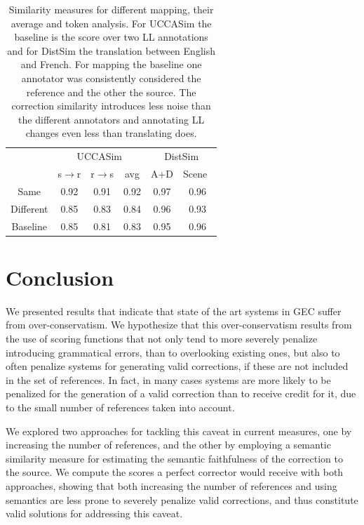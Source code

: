 \documentclass[letter,11pt]{article}
\begin{document}
\begin{table}[h!]
  \centering
  \singlespacing
  \begin{tabular}{c|c|c|c||c|c|}
  	\cline{2-6} 
  	& \multicolumn{3}{c||}{\sc UCCASim} & \multicolumn{2}{c|}{\sc DistSim}\\ \cline{2-6}
  	& s$\rightarrow$r & r$\rightarrow$s & avg & A+D & Scene\
    \\
    \hline
    Same & 0.92 & 0.91 & 0.92 & 0.97 & 0.96
    \\
    Different & 0.85 & 0.83 & 0.84 & 0.96
    & 0.93
    \\
    Baseline & 0.85 & 0.81 & 0.83 & 0.95 & 0.96
	  \end{tabular}
  \caption{Similarity measures for different mapping, their average and token analysis. For {\sc UCCASim} the baseline is the score over two LL annotations and for {\sc DistSim} the translation between English and French. For mapping the baseline one annotator was consistently considered the reference and the other the source. The correction similarity introduces less noise than the different annotators and annotating LL changes even less than translating does.\label{tab:Distances}}
\end{table}


\section{Conclusion}

We presented results that indicate that state of the art systems in GEC suffer from over-conservatism. We hypothesize that this over-conservatism results from the use of scoring functions that not only tend to more severely penalize introducing grammatical errors, than to overlooking existing ones, but also to often penalize systems for generating valid corrections, if these are not included in the set of references.
In fact, in many cases systems are more likely to be penalized for the generation of
a valid correction than to receive credit for it, due to the small number of references
taken into account.

We explored two approaches for tackling this caveat in current measures, one by
increasing the number of references, and the other by employing a semantic similarity
measure for estimating the semantic faithfulness of the correction to the source.
We compute the scores a perfect corrector would receive with both approaches, showing that both increasing the number of references and using semantics are less prone to severely penalize valid corrections, and thus constitute valid solutions for addressing this caveat.
\end{document}

